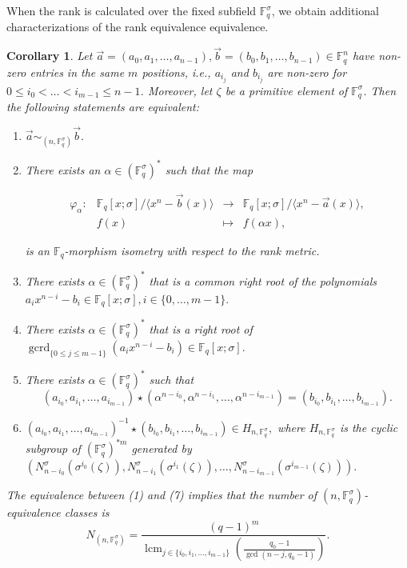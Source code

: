 \documentclass[12pt,paper]{article}
\theoremstyle{plain}
\newtheorem{corollary}[theorem]{Corollary}
\newcommand{\Fq}{\mathbb{F}_{q}}
\DeclareMathOperator{\lcm}{lcm}
\DeclareMathOperator{\gcrd}{gcrd}
\begin{document}
When the rank is calculated over the fixed subfield $\Fq^{\sigma}$, we obtain additional characterizations of the rank equivalence equivalence.
\begin{corollary}
Let $ \vec{a}=(a_0,a_1,\ldots, a_{n-1}), \vec{b}=(b_0,b_1,\ldots, b_{n-1})\in \mathbb{F}_q^{n}$ have non-zero entries in the same $m$ positions, i.e., $a_{i_j}$ and $b_{i_j}$ are non-zero  for $0\leq i_0<\dots<i_{m-1}\leq n-1$. Moreover, let $\zeta $ be a primitive element of $\Fq^{\sigma}$. Then the following statements are equivalent:

\begin{enumerate}
    \item $ \vec{a} \sim_{( n,\Fq^{\sigma})} \vec{b} .$
    \item There exists an $\alpha \in (\mathbb{F}_q^{\sigma})^*$ such that the map

  \begin{equation}
  	\begin{array}{cccc}
  	\varphi_{\alpha}:& \mathbb{F}_q[x;\sigma] /\langle x^n-\vec{b}(x) \rangle  &\longrightarrow & \mathbb{F}_q[x;\sigma] /\langle x^n-\vec{a}(x) \rangle, \\ 
  	& f(x) & \longmapsto &  f(\alpha x),
  	\end{array}
  	\end{equation} 
    
is an  $\mathbb{F}_q$-morphism isometry with respect to the rank metric.

    \item  There exists $\alpha\in (\Fq^{\sigma})^* $ that is  a common right  root of the polynomials  $\displaystyle a_i x^{n-i } - b_i \in \Fq[x;\sigma], i \in \{0,\ldots,m-1\}. $ 

    \item   There exists $\alpha\in (\Fq^{\sigma})^* $ that is a right root of  $\gcrd_{\{0 \leq j \leq m-1\}}( a_{i} x^{n - i} - b_{i}) \in \Fq[x;\sigma].$
    
     \item  There exists $\alpha\in (\mathbb{F}_q^{\sigma})^* $ such that 
     $$ (a_{i_0}, a_{i_1},\ldots, a_{i_{m-1}})\star(\alpha^{n-{i_0}}, \alpha^{n-{i_1}} , \ldots, \alpha^{n-{i_{m-1}}})=  ( b_{i_0}, b_{i_1},\ldots, b_{i_{m-1}}).$$
\item  $ (a_{i_0}, a_{i_1},\ldots, a_{i_{m-1}})^{-1}\star( b_{i_0}, b_{i_1},\ldots, b_{i_{m-1}}) \in H_{n,\Fq^{\sigma}},$ where $H_{n,\Fq^{\sigma}}$ is the cyclic subgroup of $ (\Fq^{\sigma})^{* m}$ generated by 
$ ( N_{n-i_0}^{\sigma}(\sigma^{i_0}(\zeta)), N_{n-i_1}^{\sigma}(\sigma^{i_1}(\zeta)),\ldots, N_{n-i_{m-1}}^{\sigma}(\sigma^{i_{m-1}}(\zeta)) ) .$
\end{enumerate}
The equivalence between (1) and (7) implies that the number of $(n,\Fq^{\sigma})$-equivalence classes is 
$$ 
N_{(n,\Fq^{\sigma})}= \dfrac{ (q-1)^m}{ \lcm_{ j\in \{i_0,i_1,\ldots, i_{m-1} \} }\left(\frac{q_0-1}{ \gcd(n-j,q_0-1)}\right)}. $$ 
\end{corollary}
\end{document}
